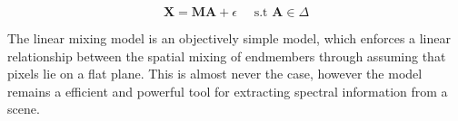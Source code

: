 \begin{equation}
    \label{lmm:abund-lmm-collection}
    \mathbf{X} = \mathbf{M} \mathbf{A} + \epsilon \quad \text{ s.t } \mathbf{A} \in \Delta
\end{equation}

The linear mixing model is an objectively simple model, which enforces a linear relationship between the spatial mixing of endmembers through assuming that pixels lie on a flat plane. This is almost never the case, however the model remains a efficient and powerful tool for extracting spectral information from a scene. 